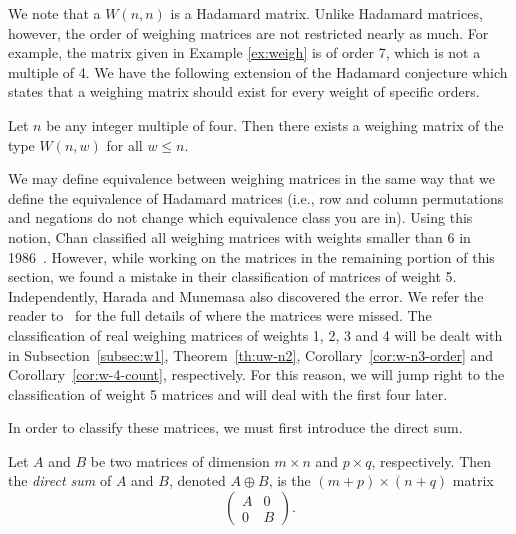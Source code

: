 We note that a $W(n,n)$ is a Hadamard matrix. Unlike Hadamard matrices, however, the order of weighing matrices are not restricted nearly as much. For example, the matrix given in Example \ref{ex:weigh} is of order 7, which is not a multiple of 4. We have the following extension of the Hadamard conjecture which states that a weighing matrix should exist for every weight of specific orders.

\begin{conjecture} \label{conj:weigh}
 Let $n$ be any integer multiple of four. Then there exists a weighing matrix of the type $W(n,w)$ for all $w \leq n$.
\end{conjecture}



We may define equivalence between weighing matrices in the same way that we define the equivalence of Hadamard matrices (i.e., row and column permutations and negations do not change which equivalence class you are in). Using this notion, Chan \etal classified all weighing matrices with weights smaller than 6 in 1986~\cite{inequiv-weigh}. However, while working on the matrices in the remaining portion of this section, we found a mistake in their classification of matrices of weight 5. Independently, Harada and Munemasa also discovered the error. We refer the reader to~\cite{Harada_Munemasa_2012} for the full details of where the matrices were missed. The classification of real weighing matrices of weights 1, 2, 3 and 4 will be dealt with in Subsection~\ref{subsec:w1}, Theorem~\ref{th:uw-n2}, Corollary~\ref{cor:w-n3-order} and Corollary~\ref{cor:w-4-count}, respectively. For this reason, we will jump right to the classification of weight 5 matrices and will deal with the first four later.

In order to classify these matrices, we must first introduce the direct sum.

\begin{definition} \label{def:direct-sum}
 Let $A$ and $B$ be two matrices of dimension $m \times n$ and $p \times q$, respectively. Then the {\it direct sum} of $A$ and $B$, denoted $A \oplus B$, is the $(m+p) \times (n+q)$ matrix $$\left(\begin{array}{cc}A&0\\0&B\end{array}\right).$$
\end{definition}


